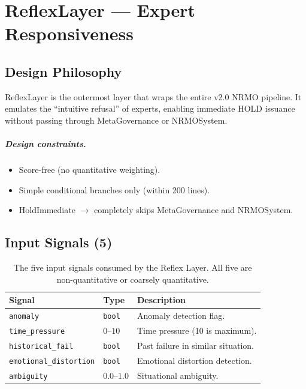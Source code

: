 
\chapter{ReflexLayer --- Expert Responsiveness}
\label{ch:reflex-layer}

\section{Design Philosophy}
\label{sec:reflex-design-philosophy}

ReflexLayer is the outermost layer that wraps the entire v2.0 NRMO
pipeline. It emulates the ``intuitive refusal'' of experts, enabling
immediate HOLD issuance without passing through MetaGovernance or
NRMOSystem.

\paragraph{Design constraints.}

\begin{itemize}
\item Score-free (no quantitative weighting).
\item Simple conditional branches only (within 200 lines).
\item HoldImmediate $\to$ completely skips MetaGovernance and
NRMOSystem.
\end{itemize}

\section{Input Signals (5)}
\label{sec:reflex-inputs}

\begin{table}[ht]
\centering
\small
\begin{tabularx}{\linewidth}{lXX}
\toprule
\textbf{Signal} & \textbf{Type} & \textbf{Description} \\
\midrule
\texttt{anomaly} & \texttt{bool} & Anomaly detection flag. \\
\texttt{time\_pressure} & $0$--$10$ & Time pressure (10 is maximum). \\
\texttt{historical\_fail} & \texttt{bool} & Past failure in similar
situation. \\
\texttt{emotional\_distortion} & \texttt{bool} & Emotional distortion
detection. \\
\texttt{ambiguity} & $0.0$--$1.0$ & Situational ambiguity. \\
\bottomrule
\end{tabularx}
\caption[Reflex Layer inputs]{The five input signals consumed by the
Reflex Layer. All five are non-quantitative or coarsely
quantitative.}
\label{tab:reflex-inputs}
\end{table}

